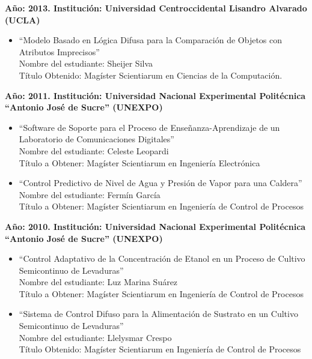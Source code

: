 \begin{footnotesize}
\begin{flushleft}
\textbf{Año: 2013. Institución: Universidad Centroccidental Lisandro Alvarado (UCLA)}\\
\begin{itemize}
\item “Modelo Basado en Lógica Difusa para la Comparación de Objetos con Atributos Imprecisos”\\
Nombre del estudiante: Sheijer Silva\\
Título Obtenido: Magíster Scientiarum en Ciencias de la Computación.
\end{itemize}

\textbf{Año: 2011. Institución: Universidad Nacional Experimental Politécnica “Antonio José de Sucre” (UNEXPO)}\\
\begin{itemize}
\item “Software de Soporte para el Proceso de Enseñanza-Aprendizaje de un Laboratorio de Comunicaciones Digitales”\\
Nombre del estudiante: Celeste Leopardi\\
Título a Obtener: Magíster Scientiarum en Ingeniería Electrónica 
\item “Control Predictivo de Nivel de Agua y Presión de Vapor  para una Caldera”\\
Nombre del estudiante: Fermín García\\
Título a Obtener: Magíster Scientiarum en Ingeniería de Control de Procesos 
\end{itemize}


\textbf{Año: 2010. Institución: Universidad Nacional Experimental Politécnica “Antonio José de Sucre” (UNEXPO)}\\
\begin{itemize}
\item “Control Adaptativo de la Concentración de Etanol en un Proceso de Cultivo Semicontinuo de Levaduras”\\
Nombre del estudiante: Luz Marina Suárez\\
Título a Obtener: Magíster Scientiarum en Ingeniería de Control de Procesos
\item “Sistema de Control Difuso para la Alimentación de Sustrato en un Cultivo Semicontinuo de Levaduras”\\
Nombre del estudiante: Llelysmar Crespo\\
Título Obtenido: Magíster Scientiarum en Ingeniería de Control de Procesos 
\end{itemize}


\end{flushleft}
\end{footnotesize}
